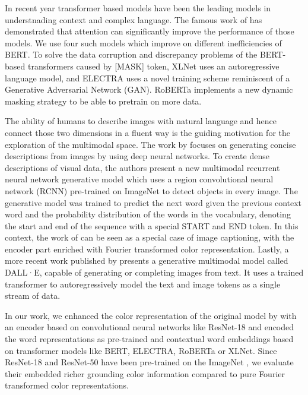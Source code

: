 \par
In recent year transformer based models have been the leading models in understnading context and complex language. The famous work of \citep{vaswani-2017-attention} has demonstrated that attention can significantly improve the performance of those models. We use four such models which improve on different inefficiencies of BERT. To solve the data corruption and discrepancy problems of the BERT-based transformers caused by [MASK] token, XLNet \citep{yang-2019-xlnet} uses an autoregressive language model, and ELECTRA \citep{clark-2020-electra} uses a novel training scheme reminiscent of a Generative Adversarial Network (GAN). RoBERTa \citep{liu-2019-roberta} implements a new dynamic masking strategy to be able to pretrain on more data.

\par
The ability of humans to describe images with natural language and hence connect those two dimensions in a fluent way is the guiding motivation for the exploration of the multimodal space. The work by \citep{karpathy-2014-image_descriptions} focuses on generating concise descriptions from images by using deep neural networks. To create dense descriptions of visual data, the authors present a new multimodal recurrent neural network generative model which uses a region convolutional neural network (RCNN) pre-trained on ImageNet \citep{deng-2009-imagenet} to detect objects in every image. The generative model was trained to predict the next word given the previous context word and the probability distribution of the words in the vocabulary, denoting the start and end of the sequence with a special START and END token. In this context, the work of \citep{monroe-2017-colors} can be seen as a special case of image captioning, with the encoder part enriched with Fourier transformed color representation. Lastly, a more recent work published by \citep{openai-2020-dalle} presents a generative multimodal model called DALL·E, capable of generating or completing images from text. It uses a trained transformer to autoregressively model the text and image tokens as a single stream of data.

\par
In our work, we enhanced the color representation of the original model by \citep{monroe-2017-colors} with an encoder based on convolutional neural networks like ResNet-18 and encoded the word representations as pre-trained and contextual word embeddings based on transformer models like BERT, ELECTRA, RoBERTa or XLNet. Since ResNet-18 and ResNet-50 have been pre-trained on the ImageNet \citep{imagenet-2019-dataset}, we evaluate their embedded richer grounding color information compared to pure Fourier transformed color representations.
